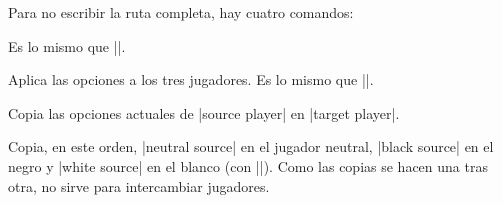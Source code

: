 Para no escribir la ruta completa, hay cuatro comandos:

\begin{command}{\pgfgosetplayer{}}
	Es lo mismo que ||.
\end{command}

\begin{command}{\pgfgosetallplayers{}}
	Aplica las opciones a los tres jugadores. Es lo mismo que ||.

	\begin{codeexample}[width=4cm]

		\begin{goban}[3]
		\end{goban}
	\end{codeexample}
\end{command}

\begin{command}{\pgfgocopyplayer{}}
	Copia las opciones actuales de |source player| en |target player|.

	\begin{codeexample}[width=3cm]

		\begin{goban}[partial = A1:C3]
		\end{goban}
	\end{codeexample}
\end{command}

\begin{command}{\pgfgocopyplayers{}}
	Copia, en este orden, |neutral source| en el jugador neutral, |black source| en el negro y |white source| en el blanco (con |\pgfgocopyplayer|). Como las copias se hacen una tras otra, no sirve para intercambiar jugadores.

	\begin{codeexample}[width=4cm]

		\begin{goban}[3]
		\end{goban}
	\end{codeexample}
\end{command}

